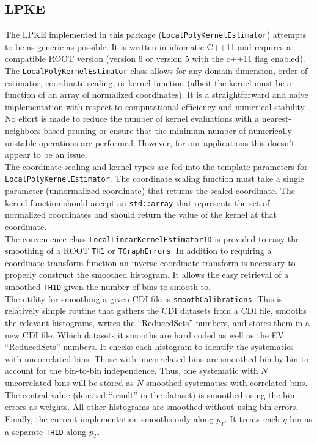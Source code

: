 \subsection{LPKE}\label{lpke}

The LPKE implemented in this package (\texttt{LocalPolyKernelEstimator})
attempts to be as generic as possible. It is written in idiomatic C++11
and requires a compatible ROOT version (version 6 or version 5 with the
c++11 flag enabled). The \texttt{LocalPolyKernelEstimator} class allows
for any domain dimension, order of estimator, coordinate scaling, or
kernel function (albeit the kernel must be a function of an array of
normalized coordinates). It is a straightforward and naive
implementation with respect to computational efficiency and numerical
stability. No effort is made to reduce the number of kernel evaluations
with a nearest-neighbors-based pruning or ensure that the minimum number
of numerically unstable operations are performed. However, for our
applications this doesn't appear to be an issue.\\The coordinate scaling
and kernel types are fed into the template parameters for
\texttt{LocalPolyKernelEstimator}. The coordinate scaling function must
take a single parameter (unnormalized coordinate) that returns the
scaled coordinate. The kernel function should accept an
\texttt{std::array} that represents the set of normalized coordinates
and should return the value of the kernel at that coordinate.\\The
convenience class \texttt{LocalLinearKernelEstimator1D} is provided to
easy the smoothing of a ROOT \texttt{TH1} or \texttt{TGraphErrors}. In
addition to requiring a coordinate transform function an inverse
coordinate transform is necessary to properly construct the smoothed
histogram. It allows the easy retrieval of a smoothed \texttt{TH1D}
given the number of bins to smooth to.\\The utility for smoothing a
given CDI file is \texttt{smoothCalibrations}. This is relatively simple
routine that gathers the CDI datasets from a CDI file, smooths the
relevant histograms, writes the ``ReducedSets'' numbers, and stores them
in a new CDI file. Which datasets it smooths are hard coded as well as
the EV ``ReducedSets'' numbers. It checks each histogram to identify the
systematics with uncorrelated bins. Those with uncorrelated bins are
smoothed bin-by-bin to account for the bin-to-bin independence. Thus,
one systematic with $N$ uncorrelated bins will be stored as $N$ smoothed
systematics with correlated bins. The central value (denoted ``result''
in the dataset) is smoothed using the bin errors as weights. All other
histograms are smoothed without using bin errors. Finally, the current
implementation smooths only along $p_T$. It treats each $\eta$ bin as a
separate \texttt{TH1D} along $p_T$.

